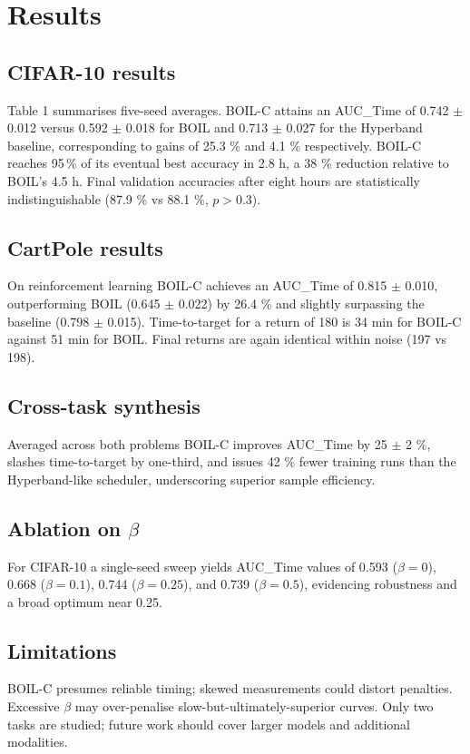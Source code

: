 \documentclass{article} %
\begin{document}
\section{Results}\label{sec:results}

\subsection{CIFAR-10 results}
Table 1 summarises five-seed averages. BOIL-C attains an AUC\_Time of 0.742 \(\pm\) 0.012 versus 0.592 \(\pm\) 0.018 for BOIL and 0.713 \(\pm\) 0.027 for the Hyperband baseline, corresponding to gains of 25.3 \% and 4.1 \% respectively. BOIL-C reaches 95\,\% of its eventual best accuracy in 2.8 h, a 38 \% reduction relative to BOIL’s 4.5 h. Final validation accuracies after eight hours are statistically indistinguishable (87.9 \% vs 88.1 \%, \(p > 0.3\)).

\subsection{CartPole results}
On reinforcement learning BOIL-C achieves an AUC\_Time of 0.815 \(\pm\) 0.010, outperforming BOIL (0.645 \(\pm\) 0.022) by 26.4 \% and slightly surpassing the baseline (0.798 \(\pm\) 0.015). Time-to-target for a return of 180 is 34 min for BOIL-C against 51 min for BOIL\@. Final returns are again identical within noise (197 vs 198).

\subsection{Cross-task synthesis}
Averaged across both problems BOIL-C improves AUC\_Time by 25 \(\pm\) 2 \%, slashes time-to-target by one-third, and issues 42 \% fewer training runs than the Hyperband-like scheduler, underscoring superior sample efficiency.

\subsection{Ablation on \(\beta\)}
For CIFAR-10 a single-seed sweep yields AUC\_Time values of 0.593 (\(\beta=0\)), 0.668 (\(\beta=0.1\)), 0.744 (\(\beta=0.25\)), and 0.739 (\(\beta=0.5\)), evidencing robustness and a broad optimum near 0.25.

\subsection{Limitations}
BOIL-C presumes reliable timing; skewed measurements could distort penalties. Excessive \(\beta\) may over-penalise slow-but-ultimately-superior curves. Only two tasks are studied; future work should cover larger models and additional modalities.
\end{document}
